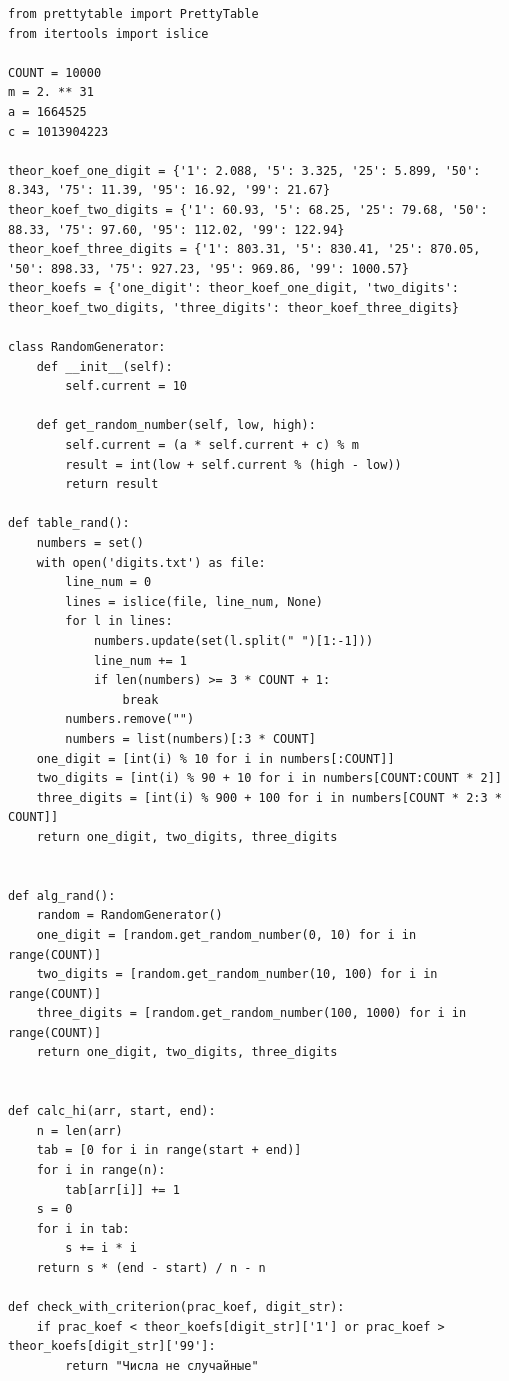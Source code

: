 \documentclass[14pt, a4paper]{extarticle}
\begin{document}
\begin{lstlisting}[label=lst:list1]
from prettytable import PrettyTable
from itertools import islice

COUNT = 10000
m = 2. ** 31
a = 1664525
c = 1013904223

theor_koef_one_digit = {'1': 2.088, '5': 3.325, '25': 5.899, '50': 8.343, '75': 11.39, '95': 16.92, '99': 21.67}
theor_koef_two_digits = {'1': 60.93, '5': 68.25, '25': 79.68, '50': 88.33, '75': 97.60, '95': 112.02, '99': 122.94}
theor_koef_three_digits = {'1': 803.31, '5': 830.41, '25': 870.05, '50': 898.33, '75': 927.23, '95': 969.86, '99': 1000.57}
theor_koefs = {'one_digit': theor_koef_one_digit, 'two_digits': theor_koef_two_digits, 'three_digits': theor_koef_three_digits}

class RandomGenerator:
    def __init__(self):
        self.current = 10

    def get_random_number(self, low, high):
        self.current = (a * self.current + c) % m
        result = int(low + self.current % (high - low))
        return result

def table_rand():
    numbers = set()
    with open('digits.txt') as file:
        line_num = 0
        lines = islice(file, line_num, None)
        for l in lines:
            numbers.update(set(l.split(" ")[1:-1]))
            line_num += 1
            if len(numbers) >= 3 * COUNT + 1:
                break
        numbers.remove("")
        numbers = list(numbers)[:3 * COUNT]
    one_digit = [int(i) % 10 for i in numbers[:COUNT]]
    two_digits = [int(i) % 90 + 10 for i in numbers[COUNT:COUNT * 2]]
    three_digits = [int(i) % 900 + 100 for i in numbers[COUNT * 2:3 * COUNT]]
    return one_digit, two_digits, three_digits


def alg_rand():
    random = RandomGenerator()
    one_digit = [random.get_random_number(0, 10) for i in range(COUNT)]
    two_digits = [random.get_random_number(10, 100) for i in range(COUNT)]
    three_digits = [random.get_random_number(100, 1000) for i in range(COUNT)]
    return one_digit, two_digits, three_digits


def calc_hi(arr, start, end):
    n = len(arr)
    tab = [0 for i in range(start + end)]
    for i in range(n):
        tab[arr[i]] += 1
    s = 0
    for i in tab:
        s += i * i
    return s * (end - start) / n - n

def check_with_criterion(prac_koef, digit_str):
    if prac_koef < theor_koefs[digit_str]['1'] or prac_koef > theor_koefs[digit_str]['99']:
        return "Числа не случайные"


\end{lstlisting}
\end{document}
